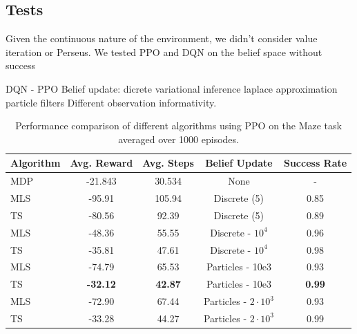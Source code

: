 \subsection{Tests}

Given the continuous nature of the environment, we didn't consider value iteration or 
Perseus. We tested PPO and DQN on the belief space without success

DQN - PPO 
Belief update: dicrete variational inference laplace approximation particle filters 
Different observation informativity.

\begin{table}[H]
    \centering
    \begin{tabular}{lcccc}
    \toprule
    \textbf{Algorithm} & \textbf{Avg. Reward} & \textbf{Avg. Steps} & \textbf{Belief Update} & \textbf{Success Rate}\\
    \midrule
    MDP & -21.843 & 30.534 & None & - \\
    \midrule
    MLS & -95.91 & 105.94 & Discrete (5) & 0.85 \\
    TS & -80.56 & 92.39 & Discrete (5) & 0.89 \\
    \midrule
    MLS & -48.36 & 55.55 & Discrete - $10^4$ & 0.96 \\
    TS & -35.81 & 47.61 & Discrete - $10^4$ & 0.98 \\
    \midrule
    MLS & -74.79 & 65.53 & Particles - 10e3 & 0.93 \\
    TS & \textbf{-32.12} & \textbf{42.87} & Particles - 10e3 & \textbf{0.99} \\
    \midrule
    MLS & -72.90 & 67.44 & Particles - $2\cdot10^3$ & 0.93 \\
    TS & -33.28 & 44.27 & Particles - $2\cdot10^3$ & 0.99 \\
    \bottomrule
    \end{tabular}
    \caption{Performance comparison of different algorithms using PPO on the Maze task averaged over 1000 episodes.}
    \label{tab:maze_results_ppo}
\end{table}

